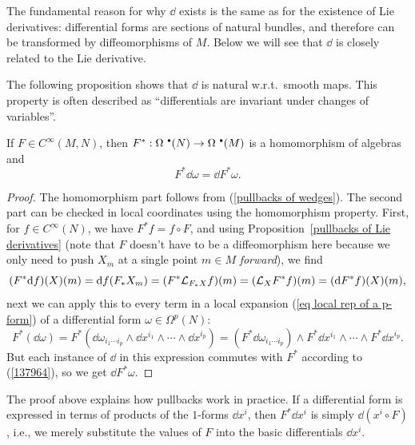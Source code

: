 The fundamental reason for why $\dd$ exists is the same as for the existence of Lie derivatives: differential forms are sections of natural bundles, and therefore can be transformed by diffeomorphisms of $M$. Below we will see that $\dd$ is closely related to the Lie derivative.

The following proposition shows that $\dd$ is natural w.r.t.\ smooth maps. This property is often described as ``differentials are invariant under changes of variables''.

\begin{prop}
    If $F\in C^\infty(M,N)$, then $F^\ast:\Omega^{\smbullet }(N)\to\Omega^{\smbullet }(M)$ is a homomorphism of algebras and
    \[F^\ast \dd\omega=\dd F^\ast\omega.\]
\end{prop}
\begin{proof}
    The homomorphism part follows from (\ref{pullbacks of wedges}). The second part can be checked in local coordinates using the homomorphism property. First, for $f\in C^\infty(N)$, we have $F^\ast f=f\circ F$, and using Proposition~\ref{pullbacks of Lie derivatives} (note that $F$ doesn't have to be a diffeomorphism here because we only need to push $X_m$ at a single point $m\in M$ \emph{forward}), we find
    \[(F^\ast {\mathrm{d}} f)(X)(m)={\mathrm{d}} f(F_\ast X_m)=(F^\ast \mathcal{L}_{F_\ast X}f)(m)=(\mathcal{L}_X F^\ast f)(m)=({\mathrm{d}} F^\ast f)(X)(m),\label{137964}\]
    next we can apply this to every term in a local expansion (\ref{eq local rep of a p-form}) of a differential form $\omega\in\Omega^p(N)$:
    \[F^\ast(\dd\omega)=F^\ast(\dd\omega_{i_1\cdots i_p}\wedge \dd x^{i_1}\wedge\cdots \wedge \dd x^{i_p})=(F^\ast\dd\omega_{i_1\cdots i_p})\wedge F^\ast \dd x^{i_1}\wedge\cdots\wedge F^\ast \dd x^{i_p}.\]
    But each instance of $\dd$ in this expression commutes with $F^\ast$ according to (\ref{137964}), so we get $\dd F^\ast\omega$.
\end{proof}

\begin{rem}
    The proof above explains how pullbacks work in practice. If a differential form is expressed in terms of products of the $1$-forms $\dd x^i$, then $F^\ast\dd x^i$ is simply $\dd (x^i\circ F)$, i.e., we merely substitute the values of $F$ into the basic differentials $\dd x^i$.
\end{rem}

